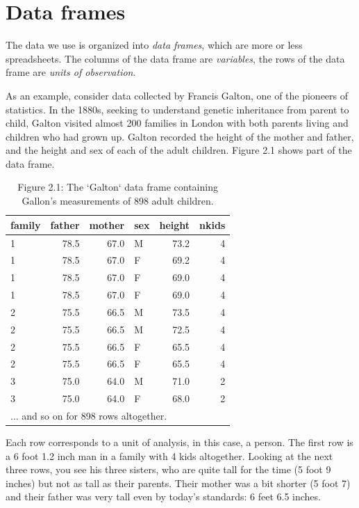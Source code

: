 \documentclass[]{tufte-book}
\begin{document}
\hypertarget{data-frames}{%
\section{Data frames}\label{data-frames}}

The data we use is organized into \emph{data frames}, which are more or less spreadsheets. The columns of the data frame are \emph{variables}, the rows of the data frame are \emph{units of observation}.

As an example, consider data collected by Francis Galton, one of the pioneers of statistics. In the 1880s, seeking to understand genetic inheritance from parent to child, Galton visited almost 200 families in London with both parents living and children who had grown up. Galton recorded the height of the mother and father, and the height and sex of each of the adult children. Figure 2.1 shows part of the data frame.

\begin{table}

\caption{\label{tab:unnamed-chunk-2}Figure 2.1: The `Galton` data frame containing Gallon's measurements of 898 adult children.}
\centering
\begin{tabular}[t]{l|r|r|l|r|r}
\hline
family & father & mother & sex & height & nkids\\
\hline
1 & 78.5 & 67.0 & M & 73.2 & 4\\
\hline
1 & 78.5 & 67.0 & F & 69.2 & 4\\
\hline
1 & 78.5 & 67.0 & F & 69.0 & 4\\
\hline
1 & 78.5 & 67.0 & F & 69.0 & 4\\
\hline
2 & 75.5 & 66.5 & M & 73.5 & 4\\
\hline
2 & 75.5 & 66.5 & M & 72.5 & 4\\
\hline
2 & 75.5 & 66.5 & F & 65.5 & 4\\
\hline
2 & 75.5 & 66.5 & F & 65.5 & 4\\
\hline
3 & 75.0 & 64.0 & M & 71.0 & 2\\
\hline
3 & 75.0 & 64.0 & F & 68.0 & 2\\
\hline
\multicolumn{6}{l}{... and so on for 898 rows altogether.}\\
\end{tabular}
\end{table}

Each row corresponds to a unit of analysis, in this case, a person. The first row is a 6 foot 1.2 inch man in a family with 4 kids altogether. Looking at the next three rows, you see his three sisters, who are quite tall for the time (5 foot 9 inches) but not as tall as their parents. Their mother was a bit shorter (5 foot 7) and their father was very tall even by today's standards: 6 feet 6.5 inches.
\end{document}
